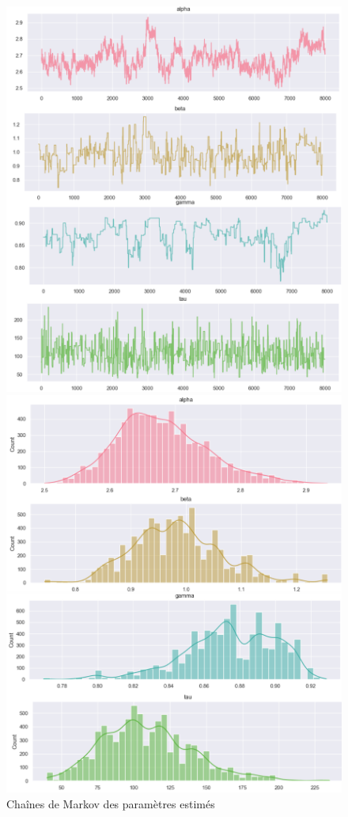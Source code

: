 \documentclass{rapportECN}
\begin{document}
\begin{figure}[H]
  \centering
  \begin{minipage}[b]{0.45\textwidth}
    \includegraphics[width=\textwidth]{logos/chaines.png}
    \caption{Chaînes de Markov des paramètres estimés}
    \label{fig:fig1}
  \end{minipage}
  \hfill
  \begin{minipage}[b]{0.45\textwidth}
    \includegraphics[width=\textwidth]{logos/densites.png}

\end{minipage}
\end{figure}
\end{document}
